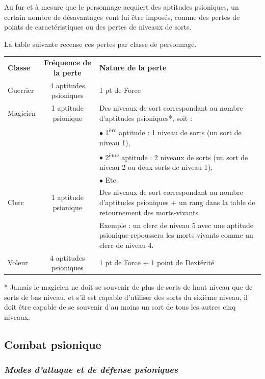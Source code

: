 \documentclass[11pt]{article}
\begin{document}
{Au fur et à mesure que le personnage acquiert des aptitudes psioniques, un certain nombre de désavantages vont lui être imposés, comme des pertes de points de caractéristiques ou des pertes de niveaux de sorts.

\bigskip

La table suivante recense ces pertes par classe de personnage.

\bigskip

\begin{tabular}{lcp{10cm}}
\textbf{Classe} & \textbf{Fréquence de la perte} & \textbf{Nature de la perte}\\
Guerrier & 4 aptitudes psioniques & 1 pt de Force \\
Magicien & 1 aptitude psionique & Des niveaux de sort correspondant au nombre d'aptitudes psioniques*, soit : \\
&& $\bullet$ 1\textsuperscript{ère} aptitude : 1 niveau de sorts (un sort de niveau 1), \\
&& $\bullet$ 2\textsuperscript{ème} aptitude : 2 niveaux de sorts (un sort de niveau 2 ou deux sorts de niveau 1), \\
&& $\bullet$ Etc. \\
Clerc & 1 aptitude psionique & Des niveaux de sort correspondant au nombre d'aptitudes psioniques + un rang dans la table de retournement des morts-vivants \\
&& Exemple : un clerc de niveau 5 avec une aptitude psionique repoussera les morts vivants comme un clerc de niveau 4. \\
Voleur & 4 aptitudes psioniques & 1 pt de Force + 1 point de Dextérité \\
\end{tabular}

\bigskip

* Jamais le magicien ne doit se souvenir de plus de sorts de haut niveau que de sorts de bas niveau, et s'il est capable d'utiliser des sorts du sixième niveau, il doit être capable de se souvenir d'au moins un sort de tous les autres cinq niveaux.

\bigskip

\subsection*{Combat psionique}

\subsubsection*{\textit{Modes d'attaque et de défense psioniques}}

}
\end{document}
